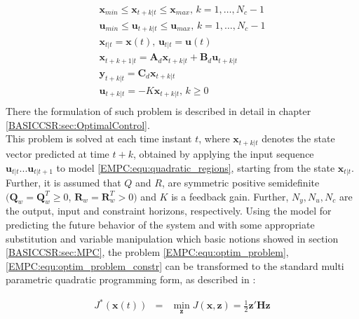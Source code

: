     \begin{equation}
        \begin{array}{l}
            \textbf{x}_{min}\leq\textbf{x}_{t+k|t}\leq\textbf{x}_{max},\,k=1,\dots,N_c-1\\
            \textbf{u}_{min}\leq\textbf{u}_{t+k|t}\leq\textbf{u}_{max},\,k=1,\dots,N_c-1\\
            \textbf{x}_{t|t}=\textbf{x}(t),\,\textbf{u}_{t|t}=\textbf{u}(t)\\
            \textbf{x}_{t+k+1|t}=\textbf{A}_d\textbf{x}_{t+k|t}+\textbf{B}_d\textbf{u}_{t+k|t}\\
            \textbf{y}_{t+k|t}=\textbf{C}_d\textbf{x}_{t+k|t}\\
            \textbf{u}_{t+k|t}=-K\textbf{x}_{t+k|t},\,k\geq0\\
        \end{array}
        \label{EMPC:equ:optim_problem_constr}
    \end{equation}
There the formulation of such problem is described in detail in chapter \ref{BASICCSR:sec:OptimalControl}.\\
    This problem is solved at each time instant $t$, where $\textbf{x}_{t+k\vert t}$ denotes the state vector predicted at time $t+k$, obtained by applying the input sequence $\textbf{u}_{t|t}...\textbf{u}_{t|t+1}$ to model \ref{EMPC:equ:quadratic_regions}, starting from the state $\textbf{x}_{t|t}$. Further, it is assumed that $Q$ and $R$, are symmetric positive semidefinite $(\textbf{Q}_w=\textbf{Q}_w^T\geq0$, $\textbf{R}_w=\textbf{R}_w^T>0)$ and $K$ is a feedback gain. Further, $N_y,N_u,N_c$ are the output, input and constraint horizons, respectively.
    Using the model for predicting the future behavior of the system and with some appropriate substitution and variable manipulation which basic notions showed in section \ref{BASICCSR:sec:MPC}, the problem \ref{EMPC:equ:optim_problem},\ref{EMPC:equ:optim_problem_constr} can be transformed to the standard multi parametric quadratic programming form, as described in \cite{rivera2013predictive}:
%

    \begin{equation}
        \begin{array}{rcl}
            J^*(\textbf{x}(t))&=&\min_{\textbf{z}}J(\textbf{x},\textbf{z})=\frac{1}{2}\textbf{z}'\textbf{H}\textbf{z}
        \end{array}
        \label{EMPC:equ:quadratic_program}
    \end{equation}

